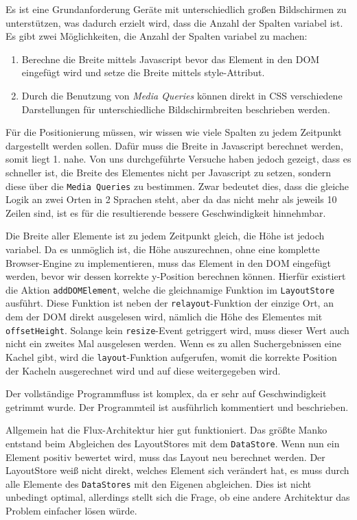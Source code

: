 \documentclass[12pt,twoside]{book}
\begin{document}
Es ist eine Grundanforderung Geräte mit unterschiedlich großen Bildschirmen zu unterstützen, was dadurch erzielt wird, dass die Anzahl der Spalten variabel ist.
Es gibt zwei Möglichkeiten, die Anzahl der Spalten variabel zu machen:

\begin{enumerate}
  \item Berechne die Breite mittels Javascript bevor das Element in den DOM eingefügt wird und setze die Breite mittels style-Attribut.
  \item Durch die Benutzung von \textit{Media Queries} können direkt in CSS verschiedene Darstellungen für unterschiedliche Bildschirmbreiten beschrieben werden.
\end{enumerate}

Für die Positionierung müssen, wir wissen wie viele Spalten zu jedem Zeitpunkt dargestellt werden sollen. Dafür muss die Breite in Javascript berechnet werden, somit liegt 1. nahe. Von uns durchgeführte Versuche haben jedoch gezeigt, dass es schneller ist, die Breite des Elementes nicht per Javascript zu setzen, sondern diese über die \texttt{Media Queries} zu bestimmen. Zwar bedeutet dies, dass die gleiche Logik an zwei Orten in 2 Sprachen steht, aber da das nicht mehr als jeweils 10 Zeilen sind, ist es für die resultierende bessere Geschwindigkeit hinnehmbar.

Die Breite aller Elemente ist zu jedem Zeitpunkt gleich, die Höhe ist jedoch variabel. Da es unmöglich ist, die Höhe auszurechnen, ohne eine komplette Browser-Engine zu implementieren, muss das Element in den DOM eingefügt werden, bevor wir dessen korrekte y-Position berechnen können. Hierfür existiert die Aktion \texttt{addDOMElement}, welche die gleichnamige Funktion im \texttt{LayoutStore} ausführt. Diese Funktion ist neben der \texttt{relayout}-Funktion der einzige Ort, an dem der DOM direkt ausgelesen wird, nämlich die Höhe des Elementes mit \texttt{offsetHeight}. Solange kein \texttt{resize}-Event getriggert wird, muss dieser Wert auch nicht ein zweites Mal ausgelesen werden.
Wenn es zu allen Suchergebnissen eine Kachel gibt, wird die \texttt{layout}-Funktion aufgerufen, womit die korrekte Position der Kacheln ausgerechnet wird und auf diese weitergegeben wird.

Der vollständige Programmfluss ist komplex, da er sehr auf Geschwindigkeit getrimmt wurde. Der Programmteil ist ausführlich kommentiert und beschrieben.

Allgemein hat die Flux-Architektur hier gut funktioniert. Das größte Manko entstand beim Abgleichen des LayoutStores mit dem \texttt{DataStore}. Wenn nun ein Element positiv bewertet wird, muss das Layout neu berechnet werden. Der LayoutStore weiß nicht direkt, welches Element sich verändert hat, es muss durch alle Elemente des \texttt{DataStores} mit den Eigenen abgleichen. Dies ist nicht unbedingt optimal, allerdings stellt sich die Frage, ob eine andere Architektur das Problem einfacher lösen würde.
\end{document}
